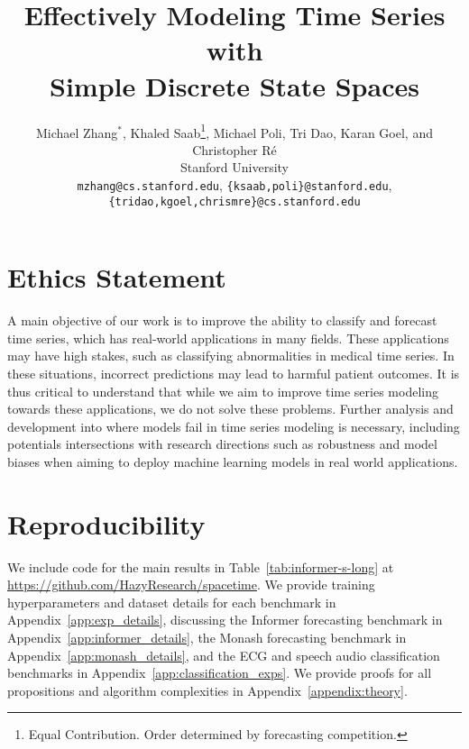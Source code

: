 \documentclass[11pt]{article}
\title{Effectively Modeling Time Series with \\Simple Discrete State Spaces}
\author{Michael Zhang$^*$, Khaled Saab\thanks{ Equal Contribution. Order determined by forecasting competition.}\;, Michael Poli,  Tri Dao, Karan Goel, and Christopher R\'{e} \\
Stanford University \\
\vspace{0.25cm}
\texttt{mzhang@cs.stanford.edu}, \texttt{\{ksaab,poli\}@stanford.edu}, \texttt{\{tridao,kgoel,chrismre\}@cs.stanford.edu}
}
\begin{document}
%
\maketitle

%
\doparttoc
\faketableofcontents
%







\newpage

\section{Ethics Statement}
A main objective of our work is to improve the ability to classify and forecast time series, which has real-world applications in many fields. These applications may have high stakes, such as classifying abnormalities in medical time series. In these situations, incorrect predictions may lead to harmful patient outcomes. It is thus critical to understand that while we aim to improve time series modeling towards these applications, we do not solve these problems. Further analysis and development into where models fail in time series modeling is necessary, including potentials intersections with research directions such as robustness and model biases when aiming to deploy machine learning models in real world applications.  
% 
\section{Reproducibility}
We include code for the main results in Table~\ref{tab:informer-s-long} at \href{https://github.com/HazyResearch/spacetime}{https://github.com/HazyResearch/spacetime}. We provide training hyperparameters and dataset details for each benchmark in Appendix~\ref{app:exp_details}, discussing the Informer forecasting benchmark in Appendix~\ref{app:informer_details}, the Monash forecasting benchmark in Appendix~\ref{app:monash_details}, and the ECG and speech audio classification benchmarks in Appendix~\ref{app:classification_exps}.
%
We provide proofs for all propositions and algorithm complexities in  Appendix~\ref{appendix:theory}. 
\end{document}
